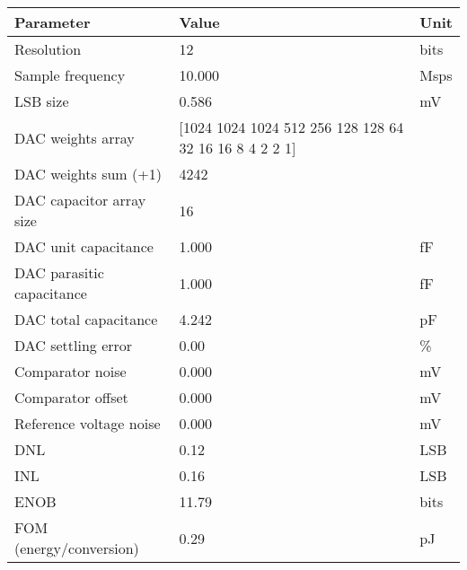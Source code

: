 \begin{tabular}{lll}
\toprule
Parameter & Value & Unit \\
\midrule
Resolution & 12 & bits \\
Sample frequency & 10.000 & Msps \\
LSB size & 0.586 & mV \\
DAC weights array & [1024 1024 1024  512  256  128  128   64   32   16   16    8    4    2
    2    1] &  \\
DAC weights sum (+1) & 4242 &  \\
DAC capacitor array size & 16 &  \\
DAC unit capacitance & 1.000 & fF \\
DAC parasitic capacitance & 1.000 & fF \\
DAC total capacitance & 4.242 & pF \\
DAC settling error & 0.00 & \% \\
Comparator noise & 0.000 & mV \\
Comparator offset & 0.000 & mV \\
Reference voltage noise & 0.000 & mV \\
DNL & 0.12 & LSB \\
INL & 0.16 & LSB \\
ENOB & 11.79 & bits \\
FOM (energy/conversion) & 0.29 & pJ \\
\bottomrule
\end{tabular}
